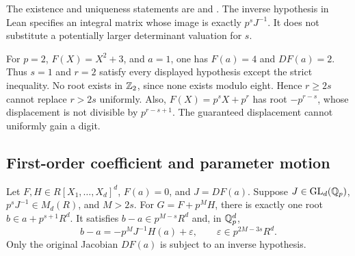 The existence and uniqueness statements are
 and
.
The inverse hypothesis in Lean specifies an integral matrix whose image
is exactly $p^sJ^{-1}$. It does not substitute a potentially larger
determinant valuation for $s$.

\begin{example}
\label{ex:weighted-boundary}
For $p=2$, $F(X)=X^2+3$, and $a=1$, one has $F(a)=4$ and $DF(a)=2$.
Thus $s=1$ and $r=2$ satisfy every displayed hypothesis except the strict
inequality. No root exists in $\mathbb Z_2$, since none exists modulo eight.
Hence $r\ge2s$ cannot replace $r>2s$ uniformly. Also,
$F(X)=p^sX+p^r$ has root $-p^{r-s}$, whose displacement is not divisible
by $p^{r-s+1}$. The guaranteed displacement cannot uniformly gain a digit.
\end{example}

\subsection{First-order coefficient and parameter motion}

\begin{theorem}\label{thm:coefficient-motion}
Let $F,H\in R[X_1,\ldots,X_d]^d$, $F(a)=0$, and $J=DF(a)$. Suppose
$J\in\operatorname{GL}_d(\mathbb Q_p)$, $p^sJ^{-1}\in M_d(R)$, and $M>2s$.
For $G=F+p^MH$, there is exactly one root $b\in a+p^{s+1}R^d$.
It satisfies $b-a\in p^{M-s}R^d$ and, in $\mathbb Q_p^d$,
\begin{equation}\label{eq:coefficient-first-order}
 b-a=-p^MJ^{-1}H(a)+\varepsilon,
 \qquad\varepsilon\in p^{2M-3s}R^d.
\end{equation}
Only the original Jacobian $DF(a)$ is subject to an inverse hypothesis.
\end{theorem}

